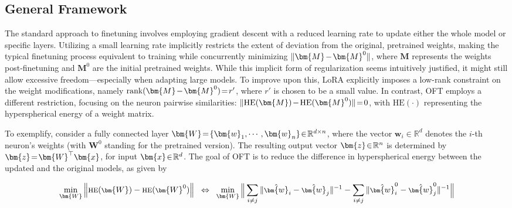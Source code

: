 \subsection{General Framework}

The standard approach to finetuning involves employing gradient descent with a reduced learning rate to update either the whole model or specific layers. Utilizing a small learning rate implicitly restricts the extent of deviation from the original, pretrained weights, making the typical finetuning process equivalent to training while concurrently minimizing $\thickmuskip=2mu \medmuskip=2mu \| \bm{M} - \bm{M}^0\|$, where $\bm{M}$ represents the weights post-finetuning and $\bm{M}^0$ are the initial pretrained weights. While this implicit form of regularization seems intuitively justified, it might still allow excessive freedom—especially when adapting large models. To improve upon this, LoRA explicitly imposes a low-rank constraint on the weight modifications, namely $\thickmuskip=2mu \medmuskip=2mu \text{rank}(\bm{M} - \bm{M}^0)=r'$, where $r'$ is chosen to be a small value. In contrast, OFT employs a different restriction, focusing on the neuron pairwise similarities: $\thickmuskip=2mu \medmuskip=2mu \| \text{HE}(\bm{M})-\text{HE}(\bm{M}^0) \|=0$, with $\text{HE}(\cdot)$ representing the hyperspherical energy of a weight matrix. 

To exemplify, consider a fully connected layer $\thickmuskip=2mu \medmuskip=2mu \bm{W}=\{\bm{w}_1,\cdots,\bm{w}_n\}\in\mathbb{R}^{d\times n}$, where the vector $\bm{w}_i\in\mathbb{R}^{d}$ denotes the $i$-th neuron's weights (with $\bm{W}^0$ standing for the pretrained version). The resulting output vector $\thickmuskip=2mu \medmuskip=2mu \bm{z}\in\mathbb{R}^n$ is determined by $\thickmuskip=2mu \medmuskip=2mu \bm{z}=\bm{W}^\top\bm{x}$, for input $\thickmuskip=2mu \medmuskip=2mu \bm{x}\in\mathbb{R}^d$. The goal of OFT is to reduce the difference in hyperspherical energy between the updated and the original models, as given by

\begin{equation}\label{eq:oft_principle}
\footnotesize
\min_{\bm{W}} \left\| \text{HE}(\bm{W})-\text{HE}(\bm{W}^0)\right\|~~\Leftrightarrow~~\min_{\bm{W}} \bigg{\|} \sum_{i\neq j} \|\hat{\bm{w}}_i-\hat{\bm{w}}_j\|^{-1}-\sum_{i\neq j} \|\hat{\bm{w}}^0_i-\hat{\bm{w}}^0_j\|^{-1}\bigg{\|}
\end{equation}

